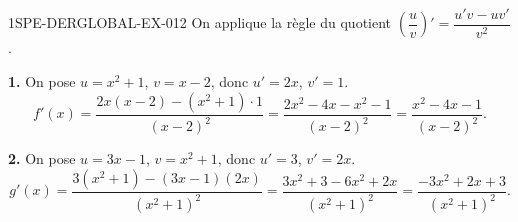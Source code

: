 \begin{corrige}{1SPE-DERGLOBAL-EX-012}
On applique la règle du quotient $\left(\dfrac{u}{v}\right)' = \dfrac{u'v - uv'}{v^2}$.

\textbf{1.} On pose $u = x^2+1$, $v = x-2$, donc $u' = 2x$, $v' = 1$.
\[
f'(x) = \frac{2x(x-2) - (x^2+1) \cdot 1}{(x-2)^2} = \frac{2x^2 - 4x - x^2 - 1}{(x-2)^2} = \boxed{\frac{x^2 - 4x - 1}{(x-2)^2}}.
\]

\textbf{2.} On pose $u = 3x-1$, $v = x^2+1$, donc $u' = 3$, $v' = 2x$.
\[
g'(x) = \frac{3(x^2+1) - (3x-1)(2x)}{(x^2+1)^2} = \frac{3x^2+3 - 6x^2+2x}{(x^2+1)^2} = \boxed{\frac{-3x^2+2x+3}{(x^2+1)^2}}.
\]
\end{corrige}
